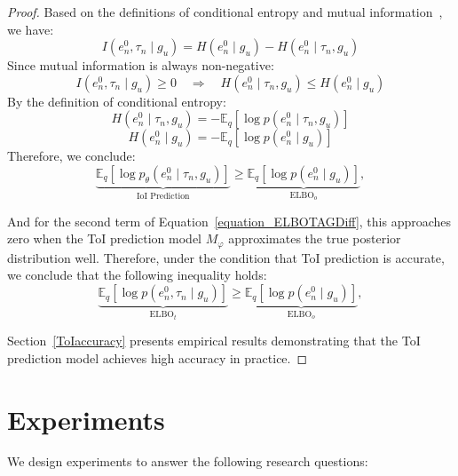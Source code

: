 \documentclass[sigconf,nonacm]{acmart}
\begin{document}
\begin{proof}
Based on the definitions of conditional entropy and mutual information~\cite{cover1999elements}, we have:
\begin{equation}
I({e}_n^0, {\tau}_n \mid {g}_u)
= H({e}_n^0 \mid {g}_u) - H({e}_n^0 \mid {\tau}_n, {g}_u)
\label{eq:mutual_info_def}
\end{equation}
Since mutual information is always non-negative:
\begin{equation}
I({e}_n^0, {\tau}_n \mid {g}_u) \geq 0 
\quad \Rightarrow \quad
H({e}_n^0 \mid {\tau}_n, {g}_u) \leq H({e}_n^0 \mid {g}_u)
\label{eq:entropy_inequality}
\end{equation}
By the definition of conditional entropy:
\begin{equation}
H({e}_n^0 \mid {\tau}_n, {g}_u)
= - \mathbb{E}_q \left[ \log p({e}_n^0 \mid {\tau}_n, {g}_u) \right]
\label{eq:cond_entropy_tau}
\end{equation}
\begin{equation}
H({e}_n^0 \mid {g}_u)
= - \mathbb{E}_q \left[ \log p({e}_n^0 \mid {g}_u) \right]
\label{eq:cond_entropy_no_tau}
\end{equation}
Therefore, we conclude:
\begin{equation}
\underbrace{\mathbb{E}_{q} \left[ \log p_\theta({e}_n^0 \mid {\tau}_n, {g}_u) \right]}_{\text{IoI Prediction}}
\geq
\underbrace{\mathbb{E}_q \left[ \log p({e}_n^0 \mid {g}_u) \right]}_{\mathrm{ELBO}_o},
\label{eq:loglikelihood_comparison}
\end{equation}

And for the second term of Equation~\ref{equation_ELBOTAGDiff}, this approaches zero when the ToI prediction model $M_\varphi$ approximates the true posterior distribution well. Therefore, under the condition that ToI prediction is accurate, we conclude that the following inequality holds:
\begin{equation}
\underbrace{\mathbb{E}_{q} \left[ \log p({e}_n^0, {\tau}_n \mid {g}_u) \right]}_{\mathrm{ELBO}_t}
\geq
\underbrace{\mathbb{E}_q \left[ \log p({e}_n^0 \mid {g}_u) \right]}_{\mathrm{ELBO}_o},
\label{eq:loglikelihood_comparison}
\end{equation}

Section~\ref{ToIaccuracy} presents empirical results demonstrating that the ToI prediction model achieves high accuracy in practice.
\end{proof}

\section{Experiments}
We design experiments to answer the following research questions:
\end{document}
